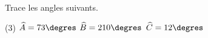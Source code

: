 %
%
Trace les angles suivants.
    \begin{tasks}(3)
        \task $\widehat{A} = 73\degres$
        \task $\widehat{B} = 210\degres$
        \task $\widehat{C} = 12\degres$
    \end{tasks}
